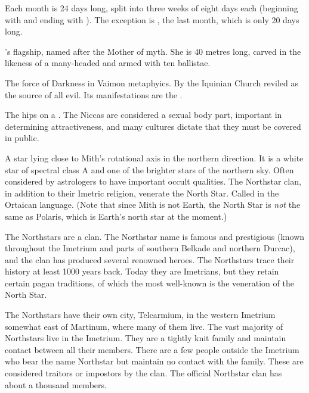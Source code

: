 \begin{gloss}
Each month is 24 days long, split into three weeks of eight days each (beginning with \Corjin{} and ending with \Siljin). The exception is \Gamishiel{}, the last month, which is only 20 days long. %
\also{\ImperialCalendar{}, \Sephiroth}



\gitem{\MotherTiamat}
\Narkiza's flagship, named after the \Dragon{} Mother of myth. She is 40 metres long, carved in the likeness of a many-headed \dragon{} and armed with ten ballistae. 



\gitem{\nieur{}}
The force of Darkness in Vaimon metaphyics. By the Iquinian Church reviled as the source of all evil. Its manifestations are the \Qliphoth. 



The hips on a \scatha{}. The Niccas are considered a sexual body part, important in determining attractiveness, and many cultures dictate that they must be covered in public. 



A star lying close to Mith's rotational axis in the northern direction. It is a white star of spectral class A and one of the brighter stars of the northern sky. Often considered by astrologers to have important occult qualities. The Northstar clan, in addition to their Imetric religion, venerate the North Star. Called  in the Ortaican language. (Note that since Mith is not Earth, the North Star is \emph{not} the same as Polaris, which is Earth's north star at the moment.)



The Northstars are a \scathaese{} clan. The Northstar name is famous and prestigious (known throughout the Imetrium and parts of southern Belkade and northern Durcac), and the clan has produced several renowned heroes. The Northstars trace their history at least 1000 years back. Today they are Imetrians, but they retain certain pagan traditions, of which the most well-known is the veneration of the North Star. 

The Northstars have their own city, Telcarmium, in the western Imetrium somewhat east of Martinum, where many of them live. The vast majority of Northstars live in the Imetrium. They are a tightly knit family and maintain contact between all their members. There are a few people outside the Imetrium who bear the name Northstar but maintain no contact with the family. These are considered traitors or impostors by the clan. The official Northstar clan has about a thousand members. 


\end{gloss}
